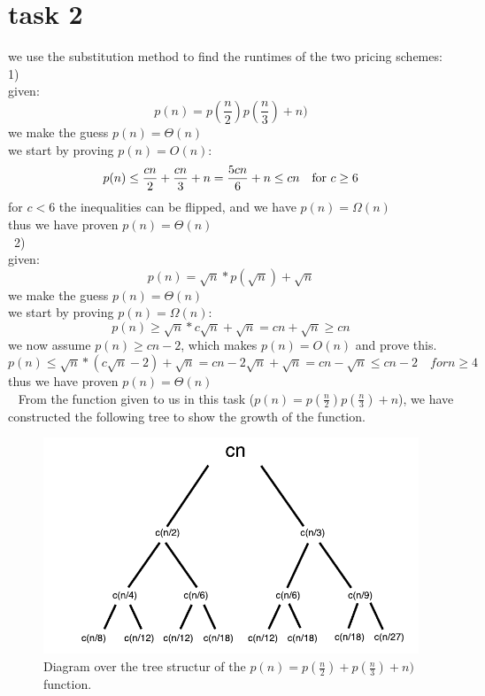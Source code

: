 \documentclass[12pt]{article}
\begin{document}
\section{task 2}
we use the substitution method to find the runtimes of the two pricing schemes:\\
1)\\
given:
\begin{equation*}
p(n) = p(\frac{n}{2}) p(\frac{n}{3}) + n)
\end{equation*}
we make the guess $p(n)= \Theta(n)$\\
we start by proving $p(n)= O(n)$:
\begin{equation*}
p(n) \leq \frac{cn}{2} + \frac{cn}{3} + n \\
= \frac{5cn}{6}+n \leq cn \quad \text{for }c \geq 6
\end{equation*}
for $c < 6$ the inequalities can be flipped, and we have $p(n) = \Omega(n)$\\
thus we have proven $p(n) = \Theta(n)$ \\\
2)\\
given: 
\begin{equation*}
p(n) = \sqrt{n} * p(\sqrt{n}) +\sqrt{n}
\end{equation*}
we make the guess $p(n)= \Theta(n)$\\
we start by proving $p(n)= \Omega(n)$:
\begin{equation*}
p(n) \geq \sqrt{n} * c\sqrt{n} +\sqrt{n}
= cn +\sqrt{n} \geq cn
\end{equation*}
we now assume $p(n) \geq cn-2$, which makes $p(n) = O(n)$ and prove this.\\
\begin{equation*}
p(n) \leq \sqrt{n} * (c\sqrt{n}-2) +\sqrt{n}
= cn -2\sqrt{n} +\sqrt{n} = cn -\sqrt{n} \leq cn - 2 \quad for n \geq 4
\end{equation*}
thus we have proven $p(n) = \Theta(n)$ \\\
\newpage
From the function given to us in this task ($p(n) = p(\frac{n}{2}) p(\frac{n}{3}) + n$), we have constructed the following tree to show the growth of the function.
\begin{figure}[!h]
 	\begin{center}
	\includegraphics[scale=1]{include/Tree_diagram}
	\end{center}
	\caption{Diagram over the tree structur of the $p(n) = p(\frac{n}{2}) + p(\frac{n}{3}) + n)$ function.}
	\label{Sekvens-user}
\end{figure}
\end{document}
